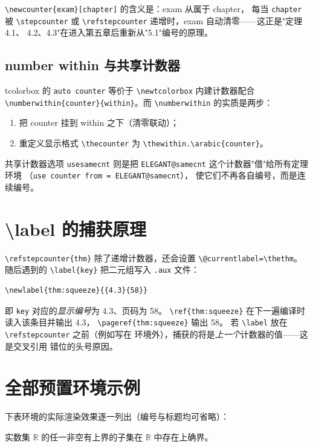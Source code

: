 \verb|\newcounter{exam}[chapter]| 的含义是：exam 从属于 chapter，
每当 \texttt{chapter} 被 \texttt{\textbackslash stepcounter} 或
\verb|\refstepcounter| 递增时，exam 自动清零——这正是"定理 4.1、
4.2、4.3"在进入第五章后重新从"5.1"编号的原理。

\subsection{number within 与共享计数器}

tcolorbox 的 \texttt{auto counter} 等价于
\verb|\newtcolorbox| 内建计数器配合
\verb|\numberwithin{counter}{within}|。而
\verb|\numberwithin| 的实质是两步：
\begin{enumerate}
  \item 把 counter 挂到 within 之下（清零联动）；
  \item 重定义显示格式 \verb|\thecounter| 为
        \verb|\thewithin.\arabic{counter}|。
\end{enumerate}

共享计数器选项 \texttt{usesamecnt} 则是把
\verb|ELEGANT@samecnt| 这个计数器"借"给所有定理环境
（\texttt{use counter from = ELEGANT@samecnt}），
使它们不再各自编号，而是连续编号。

\section{\textbackslash label 的捕获原理}

\verb|\refstepcounter{thm}| 除了递增计数器，还会设置
\verb|\@currentlabel=\thethm|。随后遇到的
\verb|\label{key}| 把二元组写入 \texttt{.aux} 文件：
\begin{verbatim}
\newlabel{thm:squeeze}{{4.3}{58}}
\end{verbatim}
即 \texttt{key} 对应的\emph{显示编号}为 4.3、页码为 58。
\verb|\ref{thm:squeeze}| 在下一遍编译时读入该条目并输出 4.3，
\verb|\pageref{thm:squeeze}| 输出 58。
若 \verb|\label| 放在 \verb|\refstepcounter| 之前（例如写在
环境外），捕获的将是\emph{上一个}计数器的值——这是交叉引用
错位的头号原因。

\section{全部预置环境示例}

下表环境的实际渲染效果逐一列出（编号与标题均可省略）：

\begin{axiom}[完备性公理]
实数集 $\mathbb{R}$ 的任一非空有上界的子集在 $\mathbb{R}$
中存在上确界。
\end{axiom}

